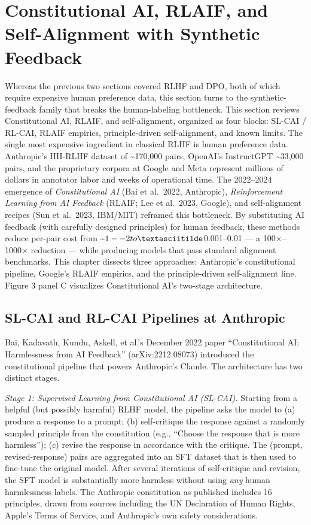 \documentclass{article}
\begin{document}
\section{Constitutional AI, RLAIF, and Self-Alignment with Synthetic Feedback}\label{constitutional-ai-rlaif-and-self-alignment-with-synthetic-feedback}

Whereas the previous two sections covered RLHF and DPO, both of which require expensive human preference data, this section turns to the synthetic-feedback family that breaks the human-labeling bottleneck. This section reviews Constitutional AI, RLAIF, and self-alignment, organized as four blocks: SL-CAI / RL-CAI, RLAIF empirics, principle-driven self-alignment, and known limits. The single most expensive ingredient in classical RLHF is human preference data. Anthropic's HH-RLHF dataset of \textasciitilde170,000 pairs, OpenAI's InstructGPT \textasciitilde33,000 pairs, and the proprietary corpora at Google and Meta represent millions of dollars in annotator labor and weeks of operational time. The 2022--2024 emergence of \emph{Constitutional AI} (Bai et al.~2022, Anthropic), \emph{Reinforcement Learning from AI Feedback} (RLAIF; Lee et al.~2023, Google), and self-alignment recipes (Sun et al.~2023, IBM/MIT) reframed this bottleneck. By substituting AI feedback (with carefully designed principles) for human feedback, these methods reduce per-pair cost from \textasciitilde$1--2 to \textasciitilde$0.001--0.01 --- a 100×--1000× reduction --- while producing models that pass standard alignment benchmarks. This chapter dissects three approaches: Anthropic's constitutional pipeline, Google's RLAIF empirics, and the principle-driven self-alignment line. Figure 3 panel C visualizes Constitutional AI's two-stage architecture.

\subsection{SL-CAI and RL-CAI Pipelines at Anthropic}\label{sl-cai-and-rl-cai-pipelines-at-anthropic}

Bai, Kadavath, Kundu, Askell, et al.'s December 2022 paper ``Constitutional AI: Harmlessness from AI Feedback'' (arXiv:2212.08073) introduced the constitutional pipeline that powers Anthropic's Claude. The architecture has two distinct stages.

\emph{Stage 1: Supervised Learning from Constitutional AI (SL-CAI).} Starting from a helpful (but possibly harmful) RLHF model, the pipeline asks the model to (a) produce a response to a prompt; (b) self-critique the response against a randomly sampled principle from the constitution (e.g., ``Choose the response that is more harmless''); (c) revise the response in accordance with the critique. The (prompt, revised-response) pairs are aggregated into an SFT dataset that is then used to fine-tune the original model. After several iterations of self-critique and revision, the SFT model is substantially more harmless without using \emph{any} human harmlessness labels. The Anthropic constitution as published includes 16 principles, drawn from sources including the UN Declaration of Human Rights, Apple's Terms of Service, and Anthropic's own safety considerations.
\end{document}
